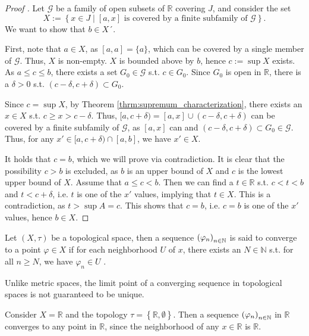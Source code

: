 \begin{proof}[Proof \cite{4561719,4561736,4203835}]
	Let $\mathscr G$ be a family of open subsets of $\mathbb R$ covering $J$, and consider the set
	$$X := \left\{ x\in J\mid [a, x] \text{ is covered by a finite subfamily of } \mathscr G \right\}.$$
	We want to show that $b\in X´$. 
	
	First, note that $a\in X$, as $[a, a] = \{a\}$, which can be covered by a single member of $\mathscr G$. Thus, $X$ is non-empty. $X$ is bounded above by $b$, hence $c := \sup X$ exists. As $a \leq c\leq b$, there exists a set $G_0\in \mathscr G$ s.t. $c\in G_{0}$. Since $G_0$ is open in $\mathbb R$, there is a $\delta > 0$ s.t. $(c - \delta, c + \delta)\subset G_{0}$.
	
	Since $c = \sup X$, by Theorem \ref{thrm:supremum_characterization}, there exists an $x\in X$ s.t. $c\geq x > c - \delta$. Thus, $[a, c + \delta) = [a, x] \cup (c - \delta, c + \delta)$ can be covered by a finite subfamily of $\mathscr G$, as $[a, x]$ can and $(c - \delta, c + \delta) \subset G_0\in\mathscr G$. Thus, for any $x'\in [a, c + \delta)\cap [a, b]$, we have $x'\in X$. 
	
	It holds that $c = b$, which we will prove via contradiction. It is clear that the possibility $c > b$ is excluded, as $b$ is an upper bound of $X$ and $c$ is the lowest upper bound of $X$. Assume that $a \leq c < b$. Then we can find a $t\in \mathbb R$ s.t. $c < t < b$ and $t < c + \delta$, i.e. $t$ is one of the $x'$ values, implying that $t\in X$. This is a contradiction, as $t > \sup A = c$. This shows that $c = b$, i.e. $c = b$ is one of the $x'$ values, hence $b\in X$.
\end{proof}

\begin{defn}
	Let $(X, \tau)$ be a topological space, then a sequence $\seq[\varphi_n]$ is said to converge to a point $\varphi\in X$ if for each neighborhood $U$ of $x$, there exists an $N\in\mathbb N$ s.t. for all $n\geq N$, we have $\varphi_n\in U$ \cite{289740}.
\end{defn}

\begin{remark}
	Unlike metric spaces, the limit point of a converging sequence in topological spaces is not guaranteed to be unique.
\end{remark}

\begin{exmp}
	Consider $X = \mathbb R$ and the topology $\tau = \left\{\mathbb R, \emptyset\right\}$. Then a sequence $\seq[\varphi_n]$ in $\mathbb R$ converges to any point in $\mathbb R$, since the neighborhood of any $x\in \mathbb R$ is $\mathbb R$.
\end{exmp}

